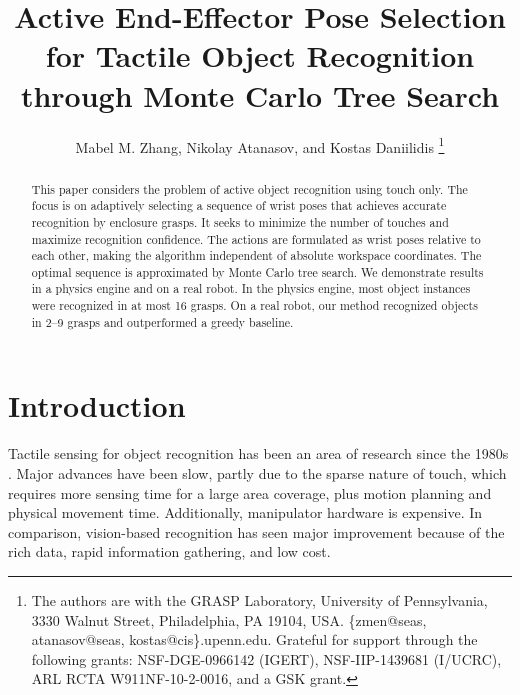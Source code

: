 \documentclass[letterpaper, 10 pt, conference]{ieeeconf}  %
\title{\LARGE \bf
Active End-Effector Pose Selection for Tactile Object Recognition through Monte Carlo Tree Search
}
\author{Mabel M. Zhang, Nikolay Atanasov, and Kostas Daniilidis%
\thanks{The authors are with the GRASP Laboratory,
        University of Pennsylvania,
        3330 Walnut Street, Philadelphia, PA 19104, USA.
        \{zmen@seas, atanasov@seas, kostas@cis\}.upenn.edu.
        Grateful for support through the following grants: NSF-DGE-0966142 (IGERT), NSF-IIP-1439681 (I/UCRC), ARL RCTA W911NF-10-2-0016, and a GSK grant.}%
}
\begin{document}
\maketitle
\thispagestyle{empty}
\pagestyle{empty}


\begin{abstract}

This paper considers the problem of active object recognition using touch only. The focus is on adaptively selecting a sequence of wrist poses that achieves accurate recognition by enclosure grasps. It seeks to minimize the number of touches and maximize recognition confidence. The actions are formulated as wrist poses relative to each other, making the algorithm independent of %
absolute workspace coordinates. The optimal sequence is approximated by Monte Carlo tree search. We demonstrate results in a physics engine and on a real robot. 
In the physics engine, most object instances were recognized in at most 16 grasps. On a real robot, our method recognized objects in 2--9 grasps and outperformed a greedy baseline.




\end{abstract}


\section{Introduction}


Tactile sensing for object recognition has been an area of research since the 1980s \cite{gaston1984, grimson1984, allen1990}. Major advances have been slow, partly due to the sparse nature of touch, which requires more sensing time for a large area coverage, plus motion planning and physical movement time. Additionally, manipulator hardware is expensive. In comparison, vision-based recognition has seen major improvement because of the rich data, rapid information gathering, and low cost.
\end{document}
